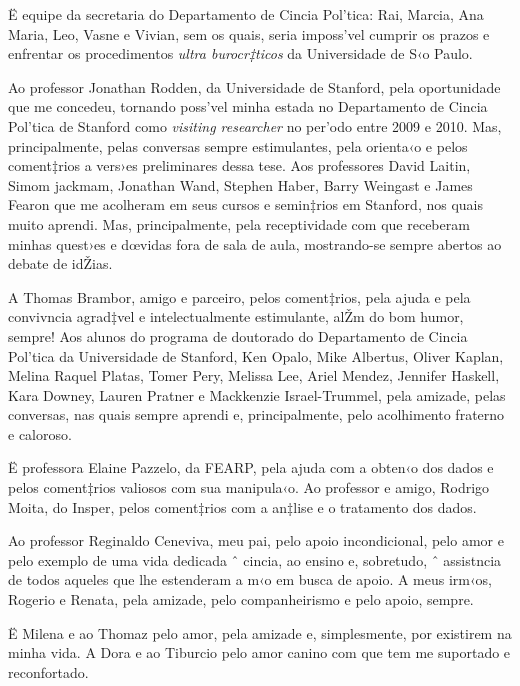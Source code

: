 \documentclass[a4paper, 12pt]{article}
\begin{document}
\sf \pagestyle{plain}
\thispagestyle{empty}

Ë equipe da secretaria do Departamento de Cincia Pol’tica: Rai, Marcia, Ana Maria, Leo, Vasne e Vivian, sem os quais, seria imposs’vel cumprir os prazos e enfrentar os procedimentos \emph{ultra burocr‡ticos} da Universidade de S‹o Paulo.

Ao professor Jonathan Rodden, da Universidade de Stanford, pela oportunidade que me concedeu, tornando poss’vel minha estada no Departamento de Cincia Pol’tica de Stanford como \emph{visiting researcher} no per’odo entre 2009 e 2010. Mas, principalmente, pelas conversas sempre estimulantes, pela orienta‹o e pelos coment‡rios a vers›es preliminares dessa tese. Aos professores David Laitin, Simom jackmam, Jonathan Wand, Stephen Haber, Barry Weingast  e James Fearon que me acolheram em seus cursos e semin‡rios em Stanford, nos quais muito aprendi. Mas, principalmente, pela receptividade com que receberam minhas quest›es e dœvidas fora de sala de aula, mostrando-se sempre abertos ao debate de idŽias. 

A Thomas Brambor, amigo e parceiro, pelos coment‡rios, pela ajuda e pela convivncia agrad‡vel e intelectualmente estimulante, alŽm do bom humor, sempre! Aos alunos do programa de doutorado do Departamento de Cincia Pol’tica da Universidade de Stanford, Ken Opalo, Mike Albertus, Oliver Kaplan, Melina Raquel Platas, Tomer Pery, Melissa Lee, Ariel Mendez, Jennifer Haskell, Kara Downey, Lauren Pratner e Mackkenzie Israel-Trummel, pela amizade, pelas conversas, nas quais sempre aprendi e, principalmente, pelo acolhimento fraterno e caloroso. 

Ë professora Elaine Pazzelo, da FEARP, pela ajuda com a obten‹o dos dados e pelos coment‡rios valiosos com sua manipula‹o. Ao professor e amigo, Rodrigo Moita, do Insper, pelos coment‡rios com a an‡lise e o tratamento dos dados. 

\sf \pagestyle{plain}
\thispagestyle{empty}

Ao professor Reginaldo Ceneviva, meu pai, pelo apoio incondicional, pelo amor e pelo exemplo de uma vida dedicada ˆ cincia, ao ensino e, sobretudo, ˆ assistncia de todos aqueles que lhe estenderam a m‹o em busca de apoio. A meus irm‹os, Rogerio e Renata, pela amizade, pelo companheirismo e pelo apoio, sempre.

Ë Milena e ao Thomaz pelo amor, pela amizade e, simplesmente, por existirem na minha vida. A Dora e ao Tiburcio pelo amor canino com que tem me suportado e reconfortado. 
\end{document}

